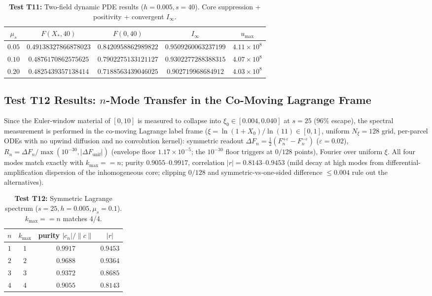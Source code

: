 \documentclass[12pt,a4paper]{article}
\begin{document}
\begin{table}[htbp]
\centering
\footnotesize
\setlength{\tabcolsep}{2pt}
\caption{\textbf{Test T11:} Two-field dynamic PDE results ($h=0.005, s=40$). Core suppression + positivity + convergent $I_\infty$.}
\vspace{0.1cm}
\begin{tabular}{@{}c|cc|c|c@{}}
\hline
$\mu_s$ & $F(X_*,40)$ & $F(0,40)$ & $I_{\infty}$ & $u_{\max}$ \\
\hline
$0.05$ & $0.49138327866878023$ & $0.8420958862989822$ & $0.9509260063237199$ & $4.11\times 10^{8}$ \\
$0.10$ & $0.4876170862575625$ & $0.7902275133121127$ & $0.9302277288388315$ & $4.07\times 10^{8}$ \\
$0.20$ & $0.4825439357138414$ & $0.7188563439046025$ & $0.902719968684912$ & $4.03\times 10^{8}$ \\
\hline
\end{tabular}
\end{table}

\subsection{Test T12 Results: $n$-Mode Transfer in the Co-Moving Lagrange Frame}

Since the Euler-window material of $[0, 10]$ is measured to collapse into $\xi_0 \in [0.004, 0.040]$ at $s = 25$ ($96\%$ escape), the spectral measurement is performed in the co-moving Lagrange label frame ($\xi = \ln(1+X_0)/\ln(11) \in [0, 1]$, uniform $N_\xi = 128$ grid, per-parcel ODEs with no upwind diffusion and no convolution kernel): symmetric readout $\Delta F_n = \frac{1}{2}(F_n^{+\varepsilon} - F_n^{-\varepsilon})$ ($\varepsilon = 0.02$), $R_n = \Delta F_n/\max(10^{-30},|\Delta F_{\mathrm{unif}}|)$ (envelope floor $1.17 \times 10^{-5}$; the $10^{-30}$ floor triggers at $0/128$ points), Fourier over uniform $\xi$. All four modes match exactly with $k_{\max} == n$; purity $0.9055\text{--}0.9917$, correlation $|r| = 0.8143\text{--}0.9453$ (mild decay at high modes from differential-amplification dispersion of the inhomogeneous core; clipping $0/128$ and symmetric-vs-one-sided difference $\le 0.004$ rule out the alternatives).

\begin{table}[htbp]
\centering
\footnotesize
\setlength{\tabcolsep}{4pt}
\caption{\textbf{Test T12:} Symmetric Lagrange spectrum ($s=25, h=0.005, \mu_s=0.1$). $k_{\max}==n$ matches 4/4.}
\vspace{0.1cm}
\begin{tabular}{@{}c|c|c|c@{}}
\hline
$n$ & $k_{\max}$ & purity $|c_n|/\|c\|$ & $|r|$ \\
\hline
$1$ & $1$ & $0.9917$ & $0.9453$ \\
$2$ & $2$ & $0.9688$ & $0.9364$ \\
$3$ & $3$ & $0.9372$ & $0.8685$ \\
$4$ & $4$ & $0.9055$ & $0.8143$ \\
\hline
\end{tabular}
\end{table}
\end{document}
